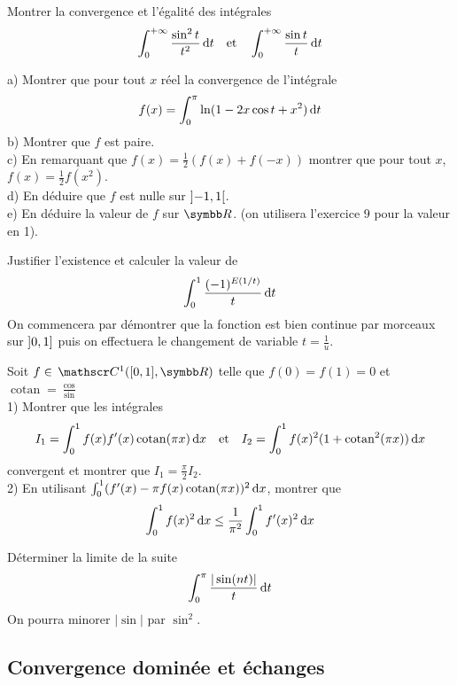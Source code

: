 \begin{exercice}
Montrer la convergence et l'égalité des intégrales
$$ \int_{0}^{+\infty}\frac{\sin^{2}t}{t^{2}}\,\mathrm{d}t \quad \text{et} \quad \int_{0}^{+\infty}\frac{\sin t}{t}\,\mathrm{d}t $$
\end{exercice}

\begin{exercice}
a) Montrer que pour tout $x$ réel la convergence de l'intégrale
$$ f(x)=\int_{0}^{\pi}\ln(1-2x \cos t+x^{2})\,\mathrm{d}t $$
b) Montrer que $f$ est paire. \\
c) En remarquant que $f(x)=\frac{1}{2}(f(x)+f(-x))$ montrer que pour tout $x$, $f(x)=\frac{1}{2}f(x^{2})$. \\
d) En déduire que $f$ est nulle sur $\left]-1, 1\right[$. \\
e) En déduire la valeur de $f$ sur $\R$. (on utilisera l'exercice 9 pour la valeur en 1).
\end{exercice}

\begin{exercice}
Justifier l'existence et calculer la valeur de
$$ \int_{0}^{1}\frac{(-1)^{E(1/t)}}{t}\,\mathrm{d}t $$
On commencera par démontrer que la fonction est bien continue par morceaux sur $\left]0, 1\right]$ puis on effectuera le changement de variable $t=\frac{1}{u}$.
\end{exercice}

\begin{exercice}
Soit $f\in \mc{1}([0,1],\R)$ telle que $f(0)=f(1)=0$ et $\operatorname{cotan}=\frac{\cos}{\sin}$ \\
1) Montrer que les intégrales
$$ I_{1}=\int_{0}^{1}f(x)f^{\prime}(x)\operatorname{cotan}(\pi x)\,\mathrm{d}x \quad \text{et} \quad I_{2}=\int_{0}^{1}f(x)^{2}(1+\operatorname{cotan}^{2}(\pi x))\,\mathrm{d}x $$
convergent et montrer que $I_{1}=\frac{\pi}{2}I_{2}$. \\
2) En utilisant $\int_{0}^{1}(f^{\prime}(x)-\pi f(x)\operatorname{cotan}(\pi x))^{2}\,\mathrm{d}x$, montrer que
$$ \int_{0}^{1}f(x)^{2}\,\mathrm{d}x \le \frac{1}{\pi^{2}}\int_{0}^{1}f^{\prime}(x)^{2}\,\mathrm{d}x $$
\end{exercice}

\begin{exercice}
Déterminer la limite de la suite
$$ \int_{0}^{\pi}\frac{|\sin(nt)|}{t}\,\mathrm{d}t $$
On pourra minorer $|\sin|$ par $\sin^{2}$.
\end{exercice}

\subsection{Convergence dominée et échanges}

